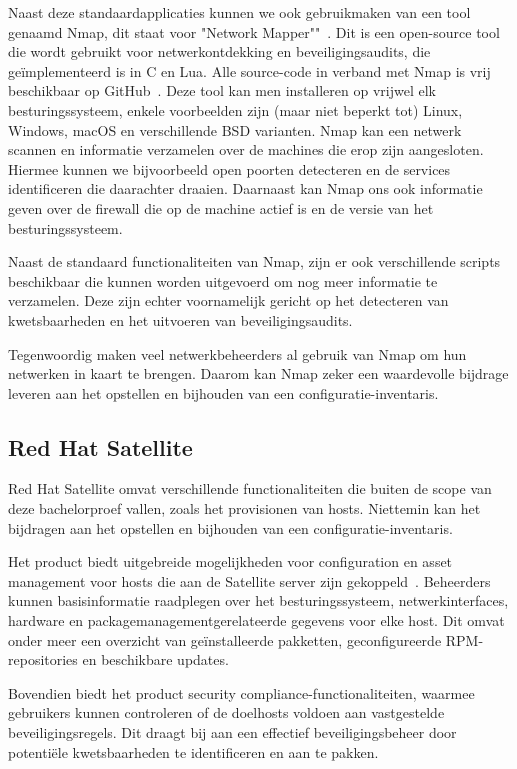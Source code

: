 Naast deze standaardapplicaties kunnen we ook gebruikmaken van een tool genaamd Nmap, dit staat voor "Network Mapper""~\autocite{nmap-website}.
Dit is een open-source tool die wordt gebruikt voor netwerkontdekking en beveiligingsaudits, die ge\"implementeerd is in C en Lua.
Alle source-code in verband met Nmap is vrij beschikbaar op GitHub~\autocite{nmap-github}.
Deze tool kan men installeren op vrijwel elk besturingssysteem, enkele voorbeelden zijn (maar niet beperkt tot) Linux, Windows, macOS en verschillende BSD varianten.
Nmap kan een netwerk scannen en informatie verzamelen over de machines die erop zijn aangesloten.
Hiermee kunnen we bijvoorbeeld open poorten detecteren en de services identificeren die daarachter draaien.
Daarnaast kan Nmap ons ook informatie geven over de firewall die op de machine actief is en de versie van het besturingssysteem.

Naast de standaard functionaliteiten van Nmap, zijn er ook verschillende scripts beschikbaar die kunnen worden uitgevoerd om nog meer informatie te verzamelen.
Deze zijn echter voornamelijk gericht op het detecteren van kwetsbaarheden en het uitvoeren van beveiligingsaudits.

Tegenwoordig maken veel netwerkbeheerders al gebruik van Nmap om hun netwerken in kaart te brengen.
Daarom kan Nmap zeker een waardevolle bijdrage leveren aan het opstellen en bijhouden van een configuratie-inventaris.

\subsection{Red Hat Satellite}
\label{sub:red-hat-satellite}

Red Hat Satellite omvat verschillende functionaliteiten die buiten de scope van deze bachelorproef vallen, zoals het provisionen van hosts.
Niettemin kan het bijdragen aan het opstellen en bijhouden van een configuratie-inventaris.

Het product biedt uitgebreide mogelijkheden voor configuration en asset management voor hosts die aan de Satellite server zijn gekoppeld~\autocite{rhel-satellite-hosts}.
Beheerders kunnen basisinformatie raadplegen over het besturingssysteem, netwerkinterfaces, hardware en packagemanagementgerelateerde gegevens voor elke host.
Dit omvat onder meer een overzicht van geïnstalleerde pakketten, geconfigureerde RPM-repositories en beschikbare updates.

Bovendien biedt het product security compliance-functionaliteiten, waarmee gebruikers kunnen controleren of de doelhosts voldoen aan vastgestelde beveiligingsregels.
Dit draagt bij aan een effectief beveiligingsbeheer door potentiële kwetsbaarheden te identificeren en aan te pakken.

